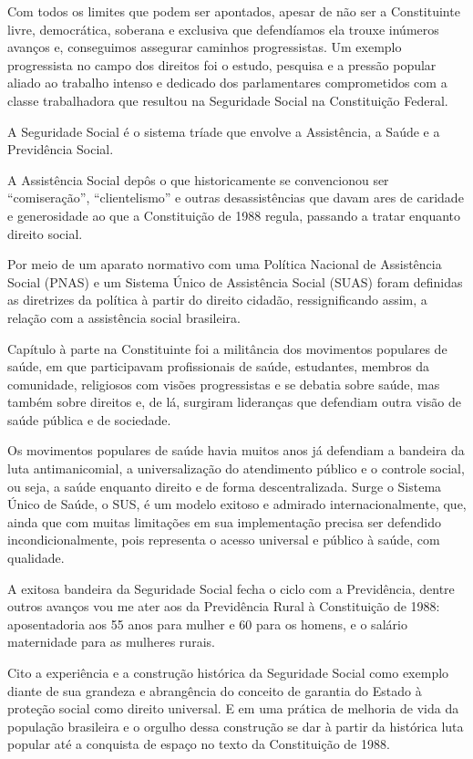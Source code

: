 Com todos os limites que podem ser apontados, apesar de não ser a
Constituinte livre, democrática, soberana e exclusiva que defendíamos
ela trouxe inúmeros avanços e, conseguimos assegurar caminhos
progressistas. Um exemplo progressista no campo dos direitos foi o
estudo, pesquisa e a pressão popular aliado ao trabalho intenso e
dedicado dos parlamentares comprometidos com a classe trabalhadora que
resultou na Seguridade Social na Constituição Federal.

A Seguridade Social é o sistema tríade que envolve a Assistência, a
Saúde e a Previdência Social.

A Assistência Social depôs o que historicamente se convencionou ser
``comiseração'', ``clientelismo'' e outras desassistências que davam
ares de caridade e generosidade ao que a Constituição de 1988 regula,
passando a tratar enquanto direito social.

Por meio de um aparato normativo com uma Política Nacional de
Assistência Social (PNAS) e um Sistema Único de Assistência Social
(SUAS) foram definidas as diretrizes da política à partir do direito
cidadão, ressignificando assim, a relação com a assistência social
brasileira.

Capítulo à parte na Constituinte foi a militância dos movimentos
populares de saúde, em que participavam profissionais de saúde,
estudantes, membros da comunidade, religiosos com visões progressistas e
se debatia sobre saúde, mas também sobre direitos e, de lá, surgiram
lideranças que defendiam outra visão de saúde pública e de sociedade.

Os movimentos populares de saúde havia muitos anos já defendiam a
bandeira da luta antimanicomial, a universalização do atendimento
público e o controle social, ou seja, a saúde enquanto direito e de
forma descentralizada. Surge o Sistema Único de Saúde, o SUS, é um
modelo exitoso e admirado internacionalmente, que, ainda que com muitas
limitações em sua implementação precisa ser defendido
incondicionalmente, pois representa o acesso universal e público à
saúde, com qualidade.

A exitosa bandeira da Seguridade Social fecha o ciclo com a Previdência,
dentre outros avanços vou me ater aos da Previdência Rural à
Constituição de 1988: aposentadoria aos 55 anos para mulher e 60 para os
homens, e o salário maternidade para as mulheres rurais.

Cito a experiência e a construção histórica da Seguridade Social como
exemplo diante de sua grandeza e abrangência do conceito de garantia do
Estado à proteção social como direito universal. E em uma prática de
melhoria de vida da população brasileira e o orgulho dessa construção se
dar à partir da histórica luta popular até a conquista de espaço no
texto da Constituição de 1988.

